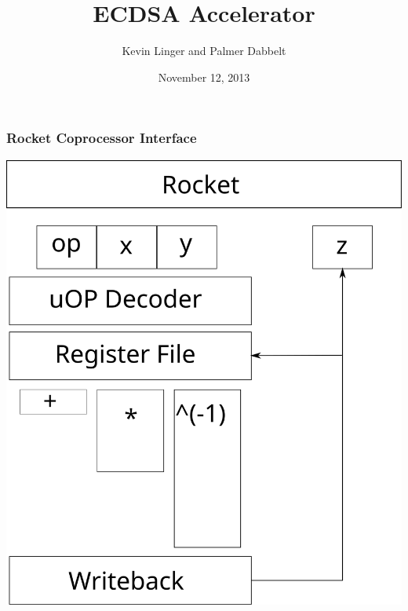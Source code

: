\documentclass{beamer}
\title{ECDSA Accelerator}
\author{Kevin Linger and Palmer Dabbelt}
\date{November 12, 2013}
\begin{document}
\maketitle

\begin{frame}
  \frametitle{Rocket Coprocessor Interface}

  \begin{center}
    \includegraphics[width=0.9\linewidth,height=0.7\textheight,keepaspectratio]{rocket_coproc.svg}
  \end{center}

\end{frame}
\end{document}
